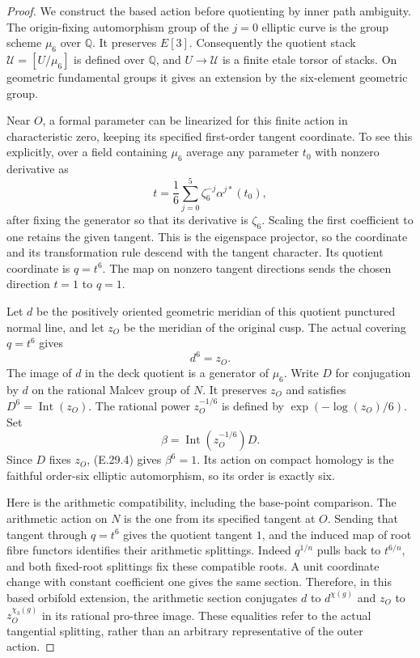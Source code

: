 \documentclass[11pt,oneside]{article}
\begin{document}
\begin{proof}
We construct the based action before quotienting by
inner path ambiguity. The origin-fixing automorphism
group of the $j=0$ elliptic curve is the group scheme
$\mu_6$ over $\mathbb Q$. It preserves $E[3]$.
Consequently the quotient stack
$\mathcal U=[U/\mu_6]$ is defined over $\mathbb Q$,
and $U\to\mathcal U$ is a finite etale torsor of
stacks. On geometric fundamental groups it gives
an extension by the six-element geometric group.

Near $O$, a formal parameter can be linearized for
this finite action in characteristic zero, keeping
its specified first-order tangent coordinate. To
see this explicitly, over a field containing
$\mu_6$ average any parameter $t_0$ with nonzero
derivative as
\[
       t=\frac16\sum_{j=0}^5
                 \zeta_6^{-j}\alpha^{j*}(t_0),
\]
after fixing the generator so that its derivative
is $\zeta_6$. Scaling the first coefficient to one
retains the given tangent. This is the eigenspace
projector, so the coordinate and its transformation
rule descend with the tangent character. Its
quotient coordinate is $q=t^6$. The map on nonzero
tangent directions sends the chosen direction
$t=1$ to $q=1$.

Let $d$ be the positively oriented geometric
meridian of this quotient punctured normal line,
and let $z_O$ be the meridian of the original cusp.
The actual covering $q=t^6$ gives
\[
                          d^6=z_O.
 \tag{E.29.4}
\]
The image of $d$ in the deck quotient is a generator
of $\mu_6$. Write $D$ for conjugation by $d$ on the
rational Malcev group of $N$. It preserves $z_O$
and satisfies $D^6=\operatorname{Int}(z_O)$.
The rational power $z_O^{-1/6}$ is defined by
$\exp(-\log(z_O)/6)$. Set
\[
                 \beta=\operatorname{Int}(z_O^{-1/6})D.
 \tag{E.29.5}
\]
Since $D$ fixes $z_O$, (E.29.4) gives $\beta^6=1$.
Its action on compact homology is the faithful
order-six elliptic automorphism, so its order is
exactly six.

Here is the arithmetic compatibility, including
the base-point comparison. The arithmetic action
on $N$ is the one from its specified tangent at
$O$. Sending that tangent through $q=t^6$ gives
the quotient tangent $1$, and the induced map of
root fibre functors identifies their arithmetic
splittings. Indeed $q^{1/n}$ pulls back to
$t^{6/n}$, and both fixed-root splittings fix these
compatible roots. A unit coordinate change with
constant coefficient one gives the same section.
Therefore, in this based orbifold extension, the
arithmetic section conjugates $d$ to $d^{\chi(g)}$
and $z_O$ to $z_O^{\chi_3(g)}$ in its rational
pro-three image. These equalities refer to the
actual tangential splitting, rather than an
arbitrary representative of the outer action.


\end{proof}
\end{document}
